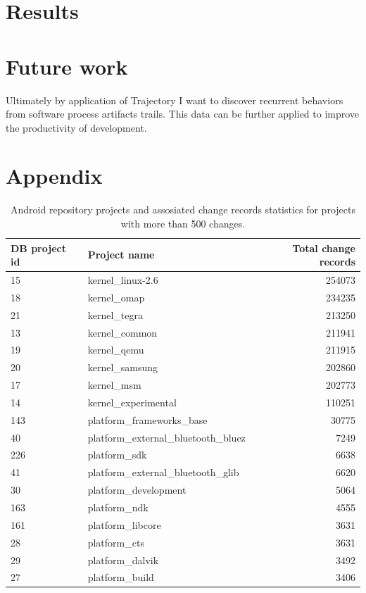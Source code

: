 \documentclass[a4paper,10pt]{article}
\numberwithin{equation}{subsection}
\begin{document}
\section{Results}


\section{Future work}
Ultimately by application of Trajectory I want to discover recurrent behaviors from
software process artifacts trails. This data can be further applied to improve the
productivity of development.
\clearpage

\section{Appendix}
\begin{table}
  \caption{Android repository projects and assosiated change records statistics 
     for projects with more than 500 changes.}
  \label{tab:projects}
  \begin{tabularx}{\textwidth}{ | X | l | r |}
  \hline                       
  DB project id & Project name & Total change records \\
  \hline 
15 & kernel\_linux-2.6 & 254073\\ 
18 & kernel\_omap & 234235\\ 
21 & kernel\_tegra & 213250\\ 
13 & kernel\_common & 211941\\ 
19 & kernel\_qemu & 211915\\ 
20 & kernel\_samsung & 202860\\ 
17 & kernel\_msm & 202773\\ 
14 & kernel\_experimental & 110251\\ 
143 & platform\_frameworks\_base & 30775\\ 
40 & platform\_external\_bluetooth\_bluez & 7249\\ 
226 & platform\_sdk & 6638\\ 
41 & platform\_external\_bluetooth\_glib & 6620\\ 
30 & platform\_development & 5064\\ 
163 & platform\_ndk & 4555\\ 
161 & platform\_libcore & 3631\\ 
28 & platform\_cts & 3631\\ 
29 & platform\_dalvik & 3492\\ 
27 & platform\_build & 3406\\ 

\end{tabularx}
\end{table}
\end{document}
